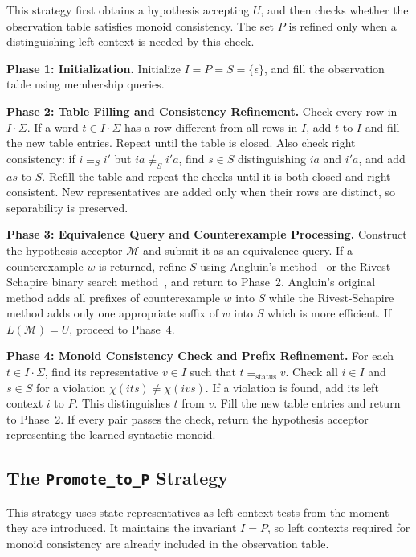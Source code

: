 \documentclass{ieice-tecrep}
\begin{document}
This strategy first obtains a hypothesis accepting \(U\), and then
checks whether the observation table satisfies monoid consistency.
The set \(P\) is refined only when a distinguishing left context is
needed by this check.

\textbf{Phase 1: Initialization.}
Initialize \(I=P=S=\{\epsilon\}\), and fill the observation table
using membership queries.

\textbf{Phase 2: Table Filling and Consistency Refinement.}
Check every row in \(I\cdot\Sigma\). If a word \(t\in I\cdot\Sigma\)
has a row different from all rows in \(I\), add \(t\) to \(I\) and
fill the new table entries. Repeat until the table is closed.
Also check right consistency: if \(i\equiv_S i'\) but
\(ia\not\equiv_S i'a\), find \(s\in S\) distinguishing \(ia\)
and \(i'a\), and add \(as\) to \(S\). Refill the table and repeat
the checks until it is both closed and right consistent.
New representatives are added only when their rows are distinct,
so separability is preserved.

\textbf{Phase 3: Equivalence Query and Counterexample Processing.}
Construct the hypothesis acceptor \(\mathcal{M}\) and submit it as an
equivalence query. If a counterexample \(w\) is returned, refine \(S\)
using Angluin's method~\cite{angluin87} or the Rivest--Schapire binary
search method~\cite{rivest1993inference}, and return to Phase~2. Angluin's original method adds all prefixes of counterexample \(w\) into
\(S\) while the Rivest-Schapire method adds only one appropriate suffix of \(w\) into \(S\) which is more efficient.
If \(L(\mathcal{M})=U\), proceed to Phase~4.

\textbf{Phase 4: Monoid Consistency Check and Prefix Refinement.}
For each \(t\in I\cdot\Sigma\), find its representative \(v\in I\)
such that \(t\equiv_{\mathrm{status}}v\). Check all \(i\in I\) and
\(s\in S\) for a violation
\(
\chi(its)\neq \chi(ivs).
\)
If a violation is found, add its left context \(i\) to \(P\).
This distinguishes \(t\) from \(v\). Fill the new table entries and
return to Phase~2. If every pair passes the check, return the
hypothesis acceptor representing the learned syntactic monoid.

\subsection{The \texttt{Promote\_to\_P} Strategy}\label{strategy-promote-to-p}

This strategy uses state representatives as left-context tests from
the moment they are introduced. It maintains the invariant
\(I = P\), so left contexts required for monoid consistency
are already included in the observation table.
\end{document}
